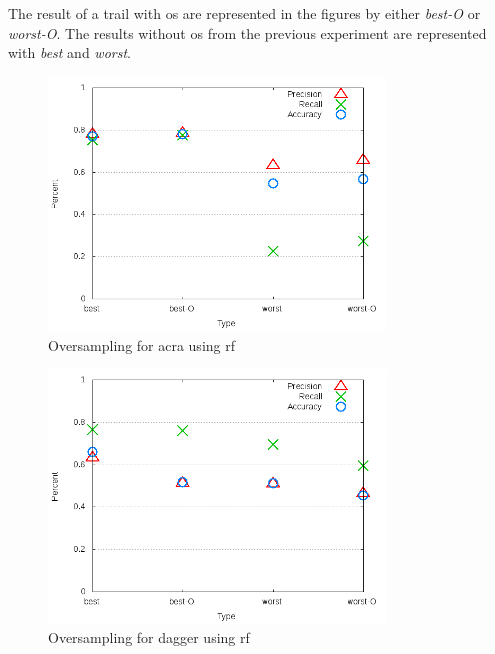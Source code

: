 The result of a trail with \gls{os} are represented in the figures by either \textit{best-O} or \textit{worst-O}. The results without \gls{os} from the previous experiment are represented with \textit{best} and \textit{worst}.

\begin{figure}[!t]
    \centering

        \includegraphics[width=0.8\textwidth]{images/rf/test_4/acra_sample_range}
        \caption{Oversampling for acra using \gls{rf}}
        \label{fig:test_4_acra_rf}
\end{figure}

\begin{figure}[!ht]
    \centering
        \includegraphics[width=0.8\textwidth]{images/rf/test_4/dagger_sample_range}
        \caption{Oversampling for dagger using \gls{rf}}
        \label{fig:test_4_dagger_rf}
\end{figure}


